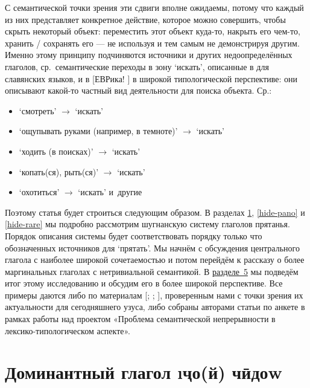 С семантической точки зрения эти сдвиги вполне ожидаемы, потому что каждый из них представляет конкретное действие, которое можно совершить, чтобы скрыть некоторый объект: переместить этот объект куда-то, накрыть его чем-то, хранить / сохранять его — не используя и тем самым не демонстрируя другим. Именно этому принципу подчиняются источники и других недоопределённых глаголов, ср.~семантические переходы в зону ‘искать’, описанные в \parencite{tolstaya2011} для славянских языков, и в [ЕВРика! \cite*{eureka2018}] в широкой типологической перспективе: они описывают какой-то частный вид деятельности для поиска объекта. Ср.:

\begin{itemize}
  \item ‘смотреть’ $\rightarrow$ ‘искать’
  \item ‘ощупывать руками (например, в темноте)’ $\rightarrow$ ‘искать’
  \item ‘ходить (в поисках)’ $\rightarrow$ ‘искать’
  \item ‘копать(ся), рыть(ся)’ $\rightarrow$ ‘искать’
  \item ‘охотиться’ $\rightarrow$ ‘искать’ и~другие
\end{itemize}

Поэтому статья будет строиться следующим образом. В разделах \ref{hide-joy}, \ref{hide-pano} и \ref{hide-rare} мы подробно рассмотрим шугнанскую систему глаголов прятанья. Порядок описания системы будет соответствовать порядку только что обозначенных источников для ‘прятать’. Мы начнём с обсуждения центрального глагола с наиболее широкой сочетаемостью и потом перейдём к рассказу о более маргинальных глаголах с нетривиальной семантикой. В \hyperref[hide-conclusion]{разделе~5} мы подведём итог этому исследованию и обсудим его в более широкой перспективе. Все примеры даются либо по материалам [\cite{karamshoev1988}; \cite*{karamshoev1991}; \cite*{karamshoev1999}], проверенным нами с точки зрения их актуальности для сегодняшнего узуса, либо собраны авторами статьи по анкете \parencite{reznikova2022} в рамках работы над проектом «Проблема семантической непрерывности в лексико-типологическом аспекте».

\section{Доминантный глагол \i{ҷо(й) чӣдоw}} \label{hide-joy}

